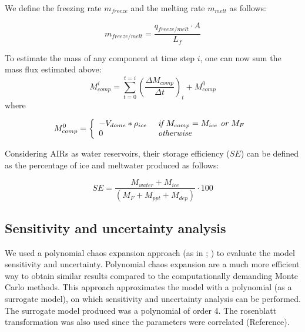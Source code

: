 \documentclass[utf8]{frontiersSCNS} %
\begin{document}
We define the freezing rate $m_{freeze}$ and the melting rate $m_{melt}$ as follows:

\begin{equation}
	m_{freeze/melt} = \frac{q_{freeze/melt} \cdot A }{L_f}
	\label{eq:m_freeze/melt}
\end{equation}

To estimate the mass of any component at time step $i$, one can now sum the mass flux estimated above: \begin{equation}
	M_{comp}^i = \sum_{t=0}^{t=i} (\frac{\Delta M_{comp}}{\Delta t})_{t} + M_{comp}^0 \end{equation} where

\begin{equation} M_{comp}^0 = \left\{ \begin{array}{ll} -V_{dome} * \rho_{ice} & \textit{ if } M_{comp}=
             M_{ice}\textit{ or }
             M_{F}                                                 \\ 0 & \textit{ otherwise }\\\end{array} \right. \\
\end{equation}

Considering AIRs as water reservoirs, their storage efficiency ($SE$) can be defined as the percentage of ice and
meltwater produced as follows:

\begin{equation} \textit{SE} = \frac{M_{water}+M_{ice}}{(M_F+M_{ppt}+M_{dep})} \cdot 100 \end{equation}

\subsection{Sensitivity and uncertainty analysis}

We used a polynomial chaos expansion approach (as in \cite{uncertainpy_2018}; \cite{Xiu_2005}) to evaluate the
model sensitivity and uncertainty. Polynomial chaos expansion are a much more efficient way to obtain similar
results compared to the computationally demanding Monte Carlo methods. This approach approximates the model with a
polynomial (as a surrogate model), on which sensitivity and uncertainty analysis can be performed.  The surrogate
model produced was a polynomial of order 4. The rosenblatt transformation was also used since the parameters were
correlated (Reference).
\end{document}
